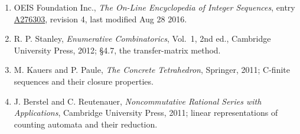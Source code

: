 \documentclass[11pt]{article}
\theoremstyle{definition}
\begin{document}
\begin{enumerate}

\item OEIS Foundation Inc., \emph{The On-Line Encyclopedia of Integer Sequences}, entry \href{https://oeis.org/A276303}{A276303}, revision 4, last modified Aug 28 2016.

\item R. P. Stanley, \emph{Enumerative Combinatorics}, Vol.~1, 2nd ed., Cambridge University Press, 2012; \S4.7, the transfer-matrix method.

\item M. Kauers and P. Paule, \emph{The Concrete Tetrahedron}, Springer, 2011; C-finite sequences and their closure properties.

\item J. Berstel and C. Reutenauer, \emph{Noncommutative Rational Series with Applications}, Cambridge University Press, 2011; linear representations of counting automata and their reduction.

\end{enumerate}
\end{document}
